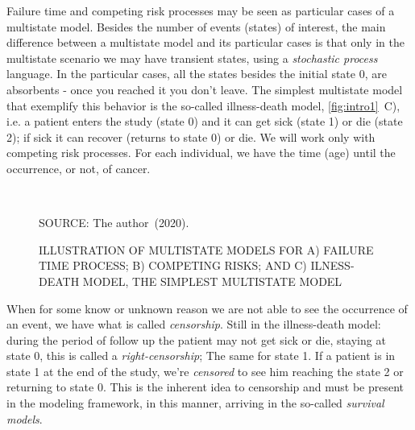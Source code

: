 Failure time and competing risk processes may be seen as particular
cases of a multistate model. Besides the number of events (states) of
interest, the main difference between a multistate model and its
particular cases is that only in the multistate scenario we may have
transient states, using a \textit{stochastic process} language. In the
particular cases, all the states besides the initial state 0, are
absorbents - once you reached it you don't leave. The simplest
multistate model that exemplify this behavior is the so-called
illness-death model, \autoref{fig:intro1}~C), i.e. a patient enters the
study (state 0) and it can get sick (state 1) or die (state 2); if sick
it can recover (returns to state 0) or die. We will work only with
competing risk processes. For each individual, we have the time (age)
until the occurrence, or not, of cancer.

\begin{figure}[H]
  \setlength{\abovecaptionskip}{.0001pt}
  \caption{ILLUSTRATION OF MULTISTATE MODELS FOR A) FAILURE TIME
    PROCESS; B) COMPETING RISKS; AND C) ILNESS-DEATH MODEL, THE SIMPLEST
    MULTISTATE MODEL}
  \vspace{0.5cm} \centering
  \\
  \vspace{0.5cm}
  \begin{footnotesize}
    SOURCE: The author~(2020).
  \end{footnotesize}
  \label{fig:intro1}
\end{figure}

When for some know or unknown reason we are not able to see the
occurrence of an event, we have what is called \textit{censorship}.
Still in the illness-death model: during the period of follow up the
patient may not get sick or die, staying at state 0, this is called a
\textit{right-censorship}; The same for state 1. If a patient is in
state 1 at the end of the study, we're \textit{censored} to see him
reaching the state 2 or returning to state 0. This is the inherent idea
to censorship and must be present in the modeling framework, in this
manner, arriving in the so-called \textit{survival models}.

